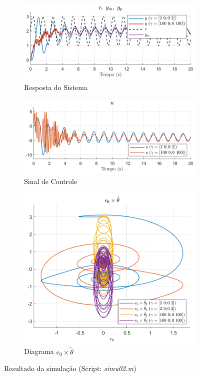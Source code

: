 \documentclass[10pt]{article}
\begin{document}
\begin{figure}[h!]
    \begin{subfigure}[b]{0.3\textwidth}
        \centering
        \includegraphics[width=\textwidth]{img/fig02c.png}
        \caption{Resposta do Sistema}
    \end{subfigure}
    \begin{subfigure}[b]{0.3\textwidth}
        \centering
        \includegraphics[width=\textwidth]{img/fig02e.png}
        \caption{Sinal de Controle}
    \end{subfigure}

    \begin{subfigure}[b]{0.3\textwidth}
        \centering
        \includegraphics[width=\textwidth]{img/fig02d.png}
        \caption{Diagrama $e_0 \times \tilde{\theta}$}
    \end{subfigure}

    \caption{Resultado da simulação (Script: \textit{simu02.m})}
    \label{fig:sim2}
\end{figure}
\end{document}
